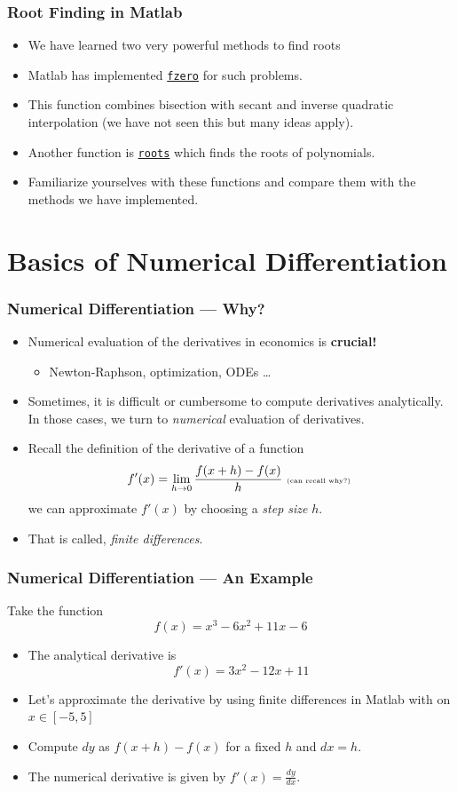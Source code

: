 \documentclass[11pt,xcolor={svgnames},aspectratio=169,usepdftitle=false]{beamer}
\begin{document}
\begin{frame}
  \frametitle{Root Finding in Matlab}
\begin{itemize}
  \item We have learned two very powerful methods to find roots
  \item Matlab has implemented \href{https://www.mathworks.com/help/matlab/ref/fzero.html}{\texttt{fzero}} for such problems.
  \item This function combines bisection with secant and inverse quadratic interpolation (we have not seen this but many ideas apply).
  \item Another function is \href{https://www.mathworks.com/help/matlab/ref/roots.html}{\texttt{roots}} which finds the roots of polynomials.
  \item Familiarize yourselves with these functions and compare them with the methods we have implemented.
\end{itemize}
\end{frame}

\section{Basics of Numerical Differentiation}

\begin{frame}
  \frametitle{Numerical Differentiation --- Why?}
\begin{itemize}
  \item Numerical evaluation of the derivatives in economics is \alert{\textbf{crucial!}}
  \begin{itemize}
    \item Newton-Raphson, optimization, ODEs \ldots
  \end{itemize}
  \item Sometimes, it is difficult or cumbersome to compute derivatives analytically. In those cases, we turn to \textit{numerical} evaluation of derivatives.
  \item Recall the definition of the derivative of a function
  \[
  f'(x) = \lim_{h\rightarrow 0} \frac{f(x+h) - f(x)}{h} \text{ \tiny (can recall why?) }
  \]
  we can approximate $f'(x)$ by choosing a \textit{step size} $h$.
  \item That is called, \textit{finite differences}.
\end{itemize}
\end{frame}

\begin{frame}
  \frametitle{Numerical Differentiation --- An Example}
Take the function 
\[
f(x) = x^3 - 6x^2 + 11x - 6
\]
\begin{itemize}
  \item The analytical derivative is 
  \[
  f'(x) = 3x^2 - 12x + 11
  \]
  \item Let's approximate the derivative by using finite differences in Matlab with on $x\in [-5,5]$
  \item Compute $dy$ as $f(x+h) - f(x)$ for a fixed $h$ and $dx = h$.
  \item The numerical derivative is given by $f'(x) = \frac{dy}{dx}$.
\end{itemize}
\end{frame}
\end{document}
